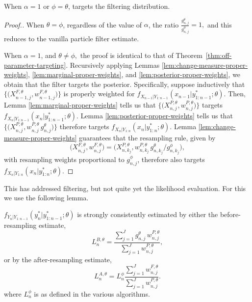 \begin{prop}[\aigen{Algorithm~\ref{alg:mop} ($\alpha=1$)} Targets the Filtering Distribution]
    When $\alpha=1$ or $\phi=\theta$,  targets the filtering distribution. 
\end{prop}
\begin{proof}[Proof.]
    When $\theta=\phi$, regardless of the value of $\alpha$, the ratio $\frac{g_{n,j}^\theta}{g_{n,j}^\phi}=1,$ and this reduces to the vanilla particle filter estimate.

    When $\alpha=1$, and $\theta\neq\phi,$ the proof is identical to that of Theorem~\ref{thm:off-parameter-targeting}. Recursively applying Lemmas \ref{lem:change-measure-proper-weights}, \ref{lem:marginal-proper-weights}, and \ref{lem:posterior-proper-weights}, we obtain that 
    the  filter targets the posterior.
    Specifically, suppose inductively that $\big\{\big(X^{F,\theta}_{n-1,j},w^{F,\theta}_{n-1,j}\big)\big\}$ is properly weighted for $f_{X_{n-1}|Y_{1:n-1}}(x_{n-1}|y^*_{1:n-1};\theta)$.
    Then, Lemma \ref{lem:marginal-proper-weights} tells us that $\big\{\big(X^{P,\theta}_{n,j},w^{P,\theta}_{n,j}\big)\big\}$ targets $f_{X_{n}|Y_{1:n-1}}(x_{n}|y^*_{1:n-1};\theta)$.
    Lemma \ref{lem:posterior-proper-weights} tells us that $\big\{\big(X^{P,\theta}_{n,j},w^{P,\theta}_{n,j} \, g^\theta_{n,j} \big)\big\}$ therefore targets  $f_{X_{n}|Y_{1:n}}(x_{n}|y^*_{1:n};\theta)$.
    Lemma \ref{lem:change-measure-proper-weights} guarantees that the resampling rule, given by 
    \begin{equation}
    \big(X^{F,\theta}_{n,j},w^{F,\theta}_{n,j}\big) = \big(X^{P,\theta}_{n,k_j}, w^{P,\theta}_{n,k_j} \, g^\theta_{n,k_j}\big/ g^\phi_{n,k_j}\big),
    \end{equation}
    with resampling weights proportional to $g^\phi_{n,j}$, therefore also targets $f_{X_{n}|Y_{1:n}}(x_{n}|y^*_{1:n};\theta)$.
\end{proof}

This has addressed filtering, but not quite yet the likelihood evaluation. For this we use the following lemma.

\begin{lem}
    \label{lem:lik-proper-weight}
  $f_{Y_n|Y_{1:n-1}}(y_n^*|y_{1:n-1}^*;\theta)$ is strongly consistently estimated by either the before-resampling estimate,
\begin{equation}\label{L1}
L_n^{B,\theta} =  \frac{\sum_{j=1}^Jg^\theta_{n,j} \, w^{P,\theta}_{n,j}}{\sum_{j=1}^J  w^{P,\theta}_{n,j}},
\end{equation}
or by the after-resampling estimate,
\begin{equation}\label{L2}
L_n^{A,\theta} = L^\phi_n \frac{\sum_{j=1}^Jw^{F,\theta}_{n,j}}{\sum_{j=1}^J  w^{P,\theta}_{n,j}}.
\end{equation}
where $L^\phi_n$ is as defined in the various algorithms.
\end{lem}

